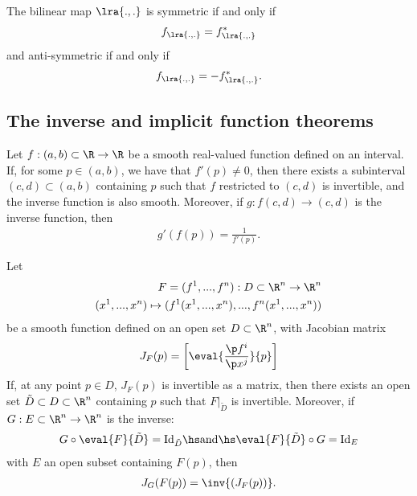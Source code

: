 \documentclass{article}
\begin{document}
\begin{lemma}
    The bilinear map $\lra{.,.}$ is symmetric if and only if 
    \begin{align*}
        f_{\lra{.,.}}=f_{\lra{.,.}}^*
    \end{align*}
    and anti-symmetric if and only if 
    \begin{align*}
        f_{\lra{.,.}}=-f_{\lra{.,.}}^*.
    \end{align*}
\end{lemma}


\subsection{The inverse and implicit function theorems}

\begin{theorem}
    Let $f:(a,b)\subset \R \to \R$ be a smooth real-valued function defined on an 
    interval. If, for some $p\in(a,b)$, we have that $f'(p)\not=0$, then there exists
    a subinterval $(c,d)\subset(a,b)$ containing $p$ such that $f$ restricted to $(c,d)$
    is invertible, and the inverse function is also smooth. Moreover, if
    $g:f(c,d)\to(c,d)$ is the inverse function, then
    \begin{align*}
        g'(f(p))=\frac{1}{f'(p)}.
    \end{align*} 
\end{theorem}

\begin{theorem}
    Let 
    \begin{align*}
        F = (f^1,...,f^n):D\subset \R^n\to\R^n\\
        (x^1,...,x^n)\mapsto (f^1(x^1,...,x^n), ..., f^n(x^1,...,x^n))
    \end{align*} 
    be a smooth function defined on an open set $D\subset\R^n$, with Jacobian matrix 
    \begin{align*}
        J_F(p)=\left[\eval{\frac{\p f^i}{\p x^j}}{p}\right]
    \end{align*}
    If, at any point $p\in D$, $J_F(p)$ is invertible as a matrix, then there exists 
    an open set $\tilde D\subset D\subset \R^n$ containing $p$ such that $F|_{\tilde D}$
    is invertible.
    Moreover, if $G:E\subset\R^n\to \R^n$ is the inverse:
    \begin{align*}
        G\circ \eval{F}{\tilde D}=\text{Id}_{\tilde D} \hs\text{and}\hs \eval{F}{\tilde D}\circ G=\text{Id}_E
    \end{align*}
    with $E$ an open subset containing $F(p)$, then
    \begin{align*}
        J_G(F(p))=\inv{(J_F(p))}.
    \end{align*}
\end{theorem}
\end{document}
